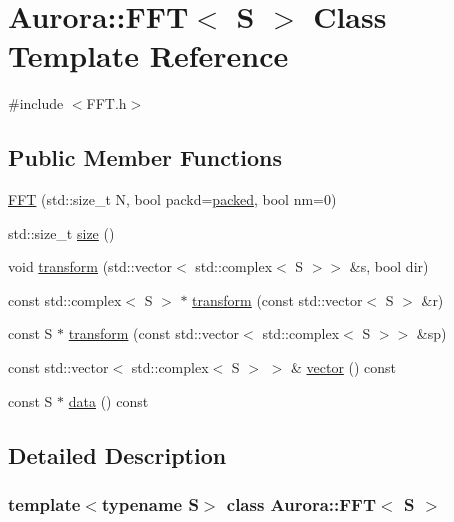 \hypertarget{class_aurora_1_1_f_f_t}{}\section{Aurora\+:\+:F\+FT$<$ S $>$ Class Template Reference}
\label{class_aurora_1_1_f_f_t}


{\ttfamily \#include $<$F\+F\+T.\+h$>$}

\subsection*{Public Member Functions}
\begin{DoxyCompactItemize}
\item 
\hyperlink{class_aurora_1_1_f_f_t_ab96506ecc02bbba26403e0a8def83f8d}{F\+FT} (std\+::size\+\_\+t N, bool packd=\hyperlink{namespace_aurora_a3e70ffc9ea5c526dcd66b1b14e43f175}{packed}, bool nm=0)
\item 
std\+::size\+\_\+t \hyperlink{class_aurora_1_1_f_f_t_ad0149c60672d3f4e64850dde22f5b163}{size} ()
\item 
void \hyperlink{class_aurora_1_1_f_f_t_a8325de64c8b9f208ed0bc8db3f74e4c7}{transform} (std\+::vector$<$ std\+::complex$<$ S $>$$>$ \&s, bool dir)
\item 
const std\+::complex$<$ S $>$ $\ast$ \hyperlink{class_aurora_1_1_f_f_t_a51ed1e25953c12b7f4cc145d19ee5cd8}{transform} (const std\+::vector$<$ S $>$ \&r)
\item 
const S $\ast$ \hyperlink{class_aurora_1_1_f_f_t_a9331bca89f3782409a7587611f1e4bab}{transform} (const std\+::vector$<$ std\+::complex$<$ S $>$$>$ \&sp)
\item 
const std\+::vector$<$ std\+::complex$<$ S $>$ $>$ \& \hyperlink{class_aurora_1_1_f_f_t_a67003935e240d8b4cf858430f6063913}{vector} () const
\item 
const S $\ast$ \hyperlink{class_aurora_1_1_f_f_t_a7462e77c06228475f0f491d7a25d7bba}{data} () const
\end{DoxyCompactItemize}


\subsection{Detailed Description}
\subsubsection*{template$<$typename S$>$\newline
class Aurora\+::\+F\+F\+T$<$ S $>$}

